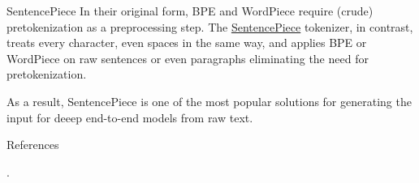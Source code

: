 \documentclass[style=upen, size=14pt]{powerdot}
\theoremstyle{definition}
\begin{document}
\begin{slide}[toc=SentencePiece]{SentencePiece}
  In their original form, BPE and WordPiece require (crude) pretokenization as a
  preprocessing step. The
  \href{https://github.com/google/sentencepiece}{SentencePiece} tokenizer, in
  contrast, treats every character, even spaces in the same way, and applies BPE
  or WordPiece on raw sentences or even paragraphs eliminating the need for
  pretokenization.

  As a result, SentencePiece is one of the most popular solutions for generating
  the input for deeep end-to-end models from raw text.
\end{slide}

\begin{slide}{References}
  
  \begin{footnotesize}

    .\medskip

  \end{footnotesize}
\end{slide}
\end{document}
